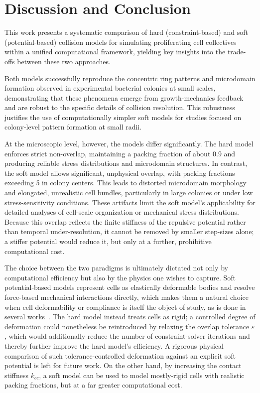 \documentclass[a4paper,fleqn]{cas-dc}
\begin{document}
\section{Discussion and Conclusion}

This work presents a systematic comparison of hard (constraint-based) and soft (potential-based) collision models for simulating proliferating cell collectives within a unified computational framework, yielding key insights into the trade-offs between these two approaches.

Both models successfully reproduce the concentric ring patterns and microdomain formation observed in experimental bacterial colonies at small scales, demonstrating that these phenomena emerge from growth-mechanics feedback and are robust to the specific details of collision resolution. This robustness justifies the use of computationally simpler soft models for studies focused on colony-level pattern formation at small radii.

At the microscopic level, however, the models differ significantly. The hard model enforces strict non-overlap, maintaining a packing fraction of about 0.9 and producing reliable stress distributions and microdomain structures. In contrast, the soft model allows significant, unphysical overlap, with packing fractions exceeding 5 in colony centers. This leads to distorted microdomain morphology and elongated, unrealistic cell bundles, particularly in large colonies or under low stress-sensitivity conditions. These artifacts limit the soft model's applicability for detailed analyses of cell-scale organization or mechanical stress distributions. Because this overlap reflects the finite stiffness of the repulsive potential rather than temporal under-resolution, it cannot be removed by smaller step-sizes alone; a stiffer potential would reduce it, but only at a further, prohibitive computational cost.

The choice between the two paradigms is ultimately dictated not only by computational efficiency but also by the physics one wishes to capture. Soft potential-based models represent cells as elastically deformable bodies and resolve force-based mechanical interactions directly, which makes them a natural choice when cell deformability or compliance is itself the object of study, as is done in several works~\cite{Farrell2013, Farrell2017, Bera2023b, GhoshLevine2017}. The hard model instead treats cells as rigid; a controlled degree of deformation could nonetheless be reintroduced by relaxing the overlap tolerance $\varepsilon$, which would additionally reduce the number of constraint-solver iterations and thereby further improve the hard model's efficiency. A rigorous physical comparison of such tolerance-controlled deformation against an explicit soft potential is left for future work. On the other hand, by increasing the contact stiffness $k_{cc}$, a soft model can be used to model mostly-rigid cells with realistic packing fractions, but at a far greater computational cost. 
\end{document}
